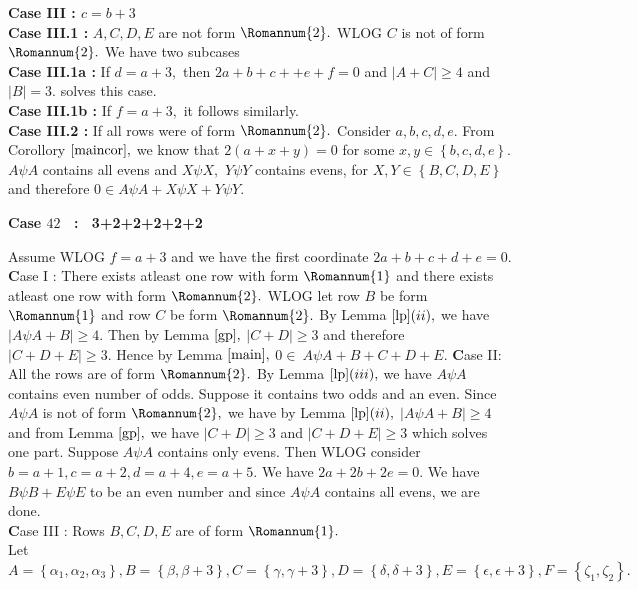 \documentclass[reqno,10pt]{amsart}
\newtheorem{remar}[prop]{Remark}
\newcommand{\one}{ \Romannum {1}}
\newcommand{\two}{\Romannum {2}}
\begin{document}
\textbf {Case III : $c=b+3$}\\
\textbf{ Case III.1 :}  $A,C,D,E$ are not form $\two.$ WLOG $C$ is not of form $\two.$ We have two subcases\\ 
\textbf {Case III.1a :} If $d=a+3,$ then $2a+b+c++e+f = 0$ and $|A+C| \geq 4$ and $|B| = 3.$ solves this case.\\
\textbf {Case III.1b :} If $f=a+3,$ it follows similarly.\\ 
\textbf {Case III.2 :} If all rows were of form $\two.$ Consider $a,b,c,d,e.$ From Corollory $\ref{maincor},$ we know that $2(a+x+y)=0$ for some $x,y \in \left\lbrace b,c,d,e \right\rbrace.$ $A \psi A$ contains all evens and $X \psi X,$ $Y  \psi Y$ contains evens, for $X,Y \in \left\lbrace B,C,D,E \right\rbrace$ and therefore $ 0 \in A\psi  A + X \psi X + Y \psi Y.$
\begin{center}
\textbf{Case $42$ \ : \ 3+2+2+2+2+2}
\end{center}
Assume WLOG $f=a+3$ and we have the first coordinate $2a+b+c+d+e=0.$     
{\textbf Case I :} There exists  atleast one row with form $\one$ and there exists atleast one row with form $\two.$ WLOG let row $B$ be form $\one$ and row $C$ be form $\two.$  By Lemma $\ref{lp} (ii),$ we have $ |A \psi A + B| \geq 4 .$ Then by Lemma $\ref{gp},$ $ |C+D| \geq 3$ and therefore $ |C+D+E| \geq 3 .$ Hence by Lemma $\ref{main},$  $0 \in \ A \psi A +B+C+D+E.$
{\textbf Case II:} All the rows are of form $\two.$  
By Lemma $\ref{lp} (iii),$ we have $ A \psi A$ contains even number of odds. Suppose it contains two odds and an even. Since $A \psi A$ is not of form $\two,$ we have by Lemma $\ref{lp} (ii),$ $ | A \psi A + B | \geq 4 $ and from Lemma $\ref{gp},$ we have $ | C + D | \geq 3 $ and  $ | C + D + E | \geq 3 $
which solves one part. Suppose $ A \psi A$ contains only evens. Then WLOG consider $ b=a+1,c=a+2,d=a+4,e=a+5.$ We have $ 2a+2b+2e = 0.$  We have $B \psi B + E \psi E$ to be an even number and  since $A \psi A$ contains all evens, we are done.\\
{\textbf Case III :} Rows $B,C,D,E$ are of form $\one.$\\
Let $A = \left\lbrace \alpha_1,\alpha_2,\alpha_3 \right\rbrace,
   B = \left\lbrace \beta,\beta+3 \right\rbrace,
   C = \left\lbrace \gamma,\gamma+3 \right\rbrace,
  D = \left\lbrace \delta,\delta+3 \right\rbrace,
   E = \left\lbrace \epsilon,\epsilon+3 \right\rbrace , F = \left\lbrace \zeta_1,\zeta_2 \right\rbrace.$ \\
\end{document}
